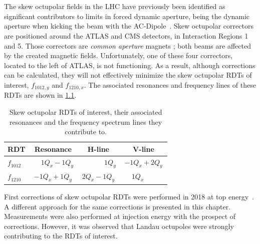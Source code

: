 \chapter{}
\label{chapter:skew_octupole_fields}
\thumbforchapter{}


\section{}

The skew octupolar fields in the LHC have previously been identified as significant contributors to 
limits in forced dynamic aperture, being the dynamic aperture when kicking the beam with the
AC-Dipole~\cite{carlier_nonlinear_2020}. Skew octupolar correctors are positioned around the
ATLAS and CMS detectors, in Interaction Regions 1 and 5. Those correctors are \textit{common
aperture} magnets ; both beams are affected by the created magnetic fields. Unfortunately, one of
these four correctors, located to the left of ATLAS, is not functioning. As a result, although
corrections can be calculated, they will not effectively minimize the skew octupolar RDTs of
interest, $f_{1012,y}$ and $f_{1210,x}$. 
The associated resonances and frequency lines of these RDTs are shown in
\cref{tab:skew_octupolar:resonances_rdts}.

\begin{table}[!htb]
    \centering
    \begin{tabular}{lccc}
      \toprule
      RDT         & Resonance                &  H-line                    & V-line         \\
      \midrule
      $f_{1012}$  & $\phantom{-}1Q_x - 1Q_y$ &  $\phantom{2Q_x-\ \,}1Q_y$ & $-1Q_x + 2Q_y$ \\
      $f_{1210}$  & $-1Q_x + 1Q_y$           &  $2Q_x - 1Q_y$             & $\phantom{-}1Q_x\phantom{+2Q_y\ \,}$    \\
      \bottomrule
    \end{tabular}
    \caption{Skew octupolar RDTs of interest, their associated resonances and the frequency spectrum
    lines they contribute to.}
    \label{tab:skew_octupolar:resonances_rdts}
\end{table}

First corrections of skew octupolar RDTs were performed in 2018 at top
energy~\cite{carlier_nonlinear_2020}. A different approach for the same corrections is presented in
this chapter.
Measurements were also performed at injection energy with the prospect of corrections. However, it
was observed that Landau octupoles were strongly contributing to the RDTs of interest.


